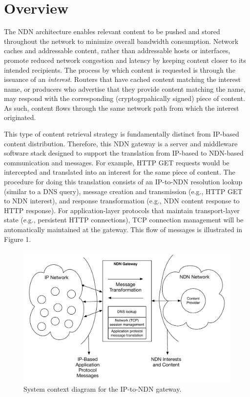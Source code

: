 \documentclass[10pt]{article}
\begin{document}
\section{Overview}
The NDN architecture enables relevant content to be pushed and stored throughout the network to minimize overall bandwidth consumption. Network caches and addressable content, rather than addressable hosts or interfaces, promote reduced network congestion and latency by keeping content closer to its intended recipients. The process by which content is requested is through the issuance of an \emph{interest}. Routers that have cached content matching the interest name, or producers who advertise that they provide content matching the name, may respond with the corresponding (cryptogrpahically signed) piece of content. As such, content flows through the same network path from which the interest originated. 

This type of content retrieval strategy is fundamentally distinct from IP-based content distribution. Therefore, this NDN gateway is a server and middleware software stack designed to support the translation from IP-based to NDN-based communication and messages. For example, HTTP GET requests would be intercepted and translated into an interest for the same piece of content. The procedure for doing this translation consists of an IP-to-NDN resolution lookup (similar to a DNS query), message creation and transmission (e.g., HTTP GET to NDN interest), and response transformation (e.g., NDN content response to HTTP response). For application-layer protocols that maintain transport-layer state (e.g., persistent HTTP connections), TCP connection management will be automatically maintained at the gateway. This flow of messages is illustrated in Figure 1. 

\begin{figure}
\begin{center}
\includegraphics[scale=0.5]{../sketches/gateway_highlevel.pdf}
\caption{System context diagram for the IP-to-NDN gateway.}
\end{center}
\end{figure}
\end{document}
